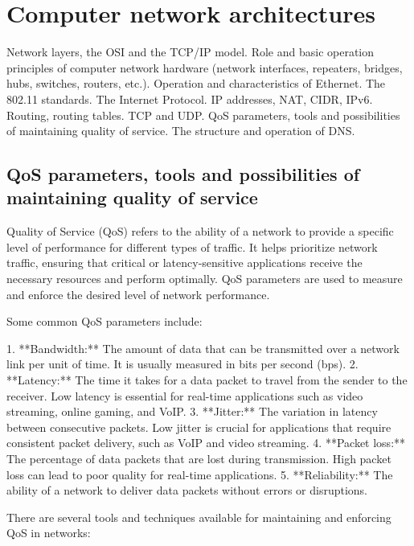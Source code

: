 \documentclass{article}
\begin{document}
\section{Computer network architectures}

Network layers, the OSI and the TCP/IP model. Role and basic operation principles of computer network hardware (network interfaces, repeaters, bridges, hubs, switches, routers, etc.). Operation and characteristics of Ethernet. The 802.11 standards. The Internet Protocol. IP addresses, NAT, CIDR, IPv6. Routing, routing tables. TCP and UDP. QoS parameters, tools and possibilities of maintaining quality of service. The structure and operation of DNS.


\subsection{QoS parameters, tools and possibilities of maintaining quality of service}

Quality of Service (QoS) refers to the ability of a network to provide a specific level of performance for different types of traffic. It helps prioritize network traffic, ensuring that critical or latency-sensitive applications receive the necessary resources and perform optimally. QoS parameters are used to measure and enforce the desired level of network performance.

Some common QoS parameters include:

1. **Bandwidth:** The amount of data that can be transmitted over a network link per unit of time. It is usually measured in bits per second (bps).
2. **Latency:** The time it takes for a data packet to travel from the sender to the receiver. Low latency is essential for real-time applications such as video streaming, online gaming, and VoIP.
3. **Jitter:** The variation in latency between consecutive packets. Low jitter is crucial for applications that require consistent packet delivery, such as VoIP and video streaming.
4. **Packet loss:** The percentage of data packets that are lost during transmission. High packet loss can lead to poor quality for real-time applications.
5. **Reliability:** The ability of a network to deliver data packets without errors or disruptions.

There are several tools and techniques available for maintaining and enforcing QoS in networks:
\end{document}
